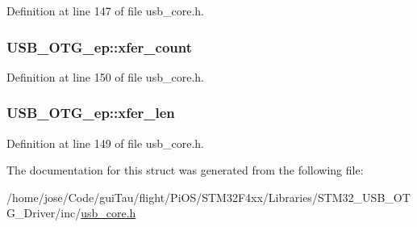 Definition at line 147 of file usb\-\_\-core.\-h.

\hypertarget{struct_u_s_b___o_t_g__ep_a23619223b14a29a11d1104cc759a4bd3}{
\subsubsection[{xfer\-\_\-count}]{ U\-S\-B\-\_\-\-O\-T\-G\-\_\-ep\-::xfer\-\_\-count}}\label{struct_u_s_b___o_t_g__ep_a23619223b14a29a11d1104cc759a4bd3}


Definition at line 150 of file usb\-\_\-core.\-h.

\hypertarget{struct_u_s_b___o_t_g__ep_a3e57f0f46e9ba0300fc51321cf05b652}{
\subsubsection[{xfer\-\_\-len}]{ U\-S\-B\-\_\-\-O\-T\-G\-\_\-ep\-::xfer\-\_\-len}}\label{struct_u_s_b___o_t_g__ep_a3e57f0f46e9ba0300fc51321cf05b652}


Definition at line 149 of file usb\-\_\-core.\-h.



The documentation for this struct was generated from the following file\-:\begin{DoxyCompactItemize}
\item 
/home/jose/\-Code/gui\-Tau/flight/\-Pi\-O\-S/\-S\-T\-M32\-F4xx/\-Libraries/\-S\-T\-M32\-\_\-\-U\-S\-B\-\_\-\-O\-T\-G\-\_\-\-Driver/inc/\hyperlink{_s_t_m32_f4xx_2_libraries_2_s_t_m32___u_s_b___o_t_g___driver_2inc_2usb__core_8h}{usb\-\_\-core.\-h}\end{DoxyCompactItemize}
